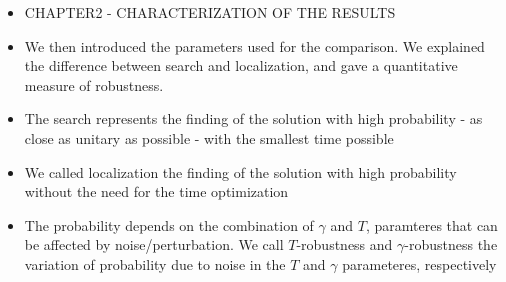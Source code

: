 \begin{itemize}
  \item CHAPTER2 - CHARACTERIZATION OF THE RESULTS
  \item We then introduced the parameters used for the comparison. We explained the difference between search and localization, and gave a quantitative measure of robustness.
  \item The search represents the finding of the solution with high probability - as close as unitary as possible - with the smallest time possible
  \item We called localization the finding of the solution with high probability without the need for the time optimization
  \item The probability depends on the combination of $\gamma$ and $T$, paramteres that can be affected by noise/perturbation. We call $T$-robustness and $\gamma$-robustness the variation of probability due to noise in the $T$ and $\gamma$ parameteres, respectively


\end{itemize}
